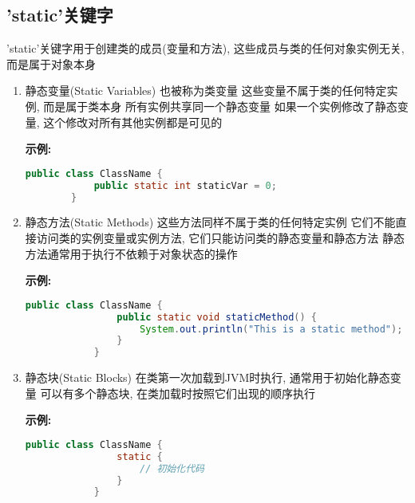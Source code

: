 \documentclass{article}
\begin{document}
\subsection{ 'static'关键字}
'static'关键字用于创建类的成员(变量和方法), 这些成员与类的任何对象实例无关,而是属于对象本身
\begin{enumerate}
    \item 静态变量(Static Variables)
    \subitem 也被称为类变量
    \subitem 这些变量不属于类的任何特定实例, 而是属于类本身
    \subitem 所有实例共享同一个静态变量
    \subitem 如果一个实例修改了静态变量, 这个修改对所有其他实例都是可见的
    
    \textbf{示例:}

\begin{tcolorbox}
    \begin{lstlisting}[language=java]
        public class ClassName {
            public static int staticVar = 0;
        } 
    \end{lstlisting}
\end{tcolorbox}
    \item 静态方法(Static Methods)
    \subitem 这些方法同样不属于类的任何特定实例
    \subitem 它们不能直接访问类的实例变量或实例方法, 它们只能访问类的静态变量和静态方法
    \subitem 静态方法通常用于执行不依赖于对象状态的操作

    \textbf{示例:}
    \begin{tcolorbox}
        \begin{lstlisting}[language=java]
            public class ClassName {
                public static void staticMethod() {
                    System.out.println("This is a static method");
                }
            }
        \end{lstlisting}
    \end{tcolorbox}
    \item 静态块(Static Blocks)
    \subitem 在类第一次加载到JVM时执行, 通常用于初始化静态变量
    \subitem 可以有多个静态块, 在类加载时按照它们出现的顺序执行

    \textbf{示例:}
    \begin{tcolorbox}
        \begin{lstlisting}[language=java]
            public class ClassName {
                static {
                    // 初始化代码
                }
            }
        \end{lstlisting}
    \end{tcolorbox}
\end{enumerate}
\end{document}
